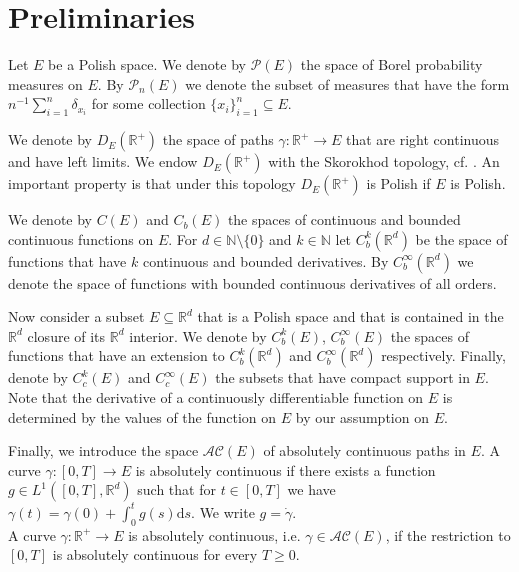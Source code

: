 \documentclass[a4paper]{article}
\newcommand{\cA}{\mathcal{A}}
\newcommand{\cC}{\mathcal{C}}
\newcommand{\cP}{\mathcal{P}}
\newcommand{\bN}{\mathbb{N}}
\newcommand{\bR}{\mathbb{R}}
\newcommand{\dd}{ \mathrm{d}}
\numberwithin{equation}{section}
\theoremstyle{definition}
\begin{document}
\section{Preliminaries} \label{section:preliminaries}

Let $E$ be a Polish space. We denote by $\cP(E)$ the space of Borel probability measures on $E$. By $\cP_n(E)$ we denote the subset of measures that have the form $n^{-1} \sum_{i=1}^n \delta_{x_i}$ for some collection $\{x_i\}_{i=1}^n \subseteq E$.

We denote by $D_E(\bR^+)$ the space of paths $\gamma : \bR^+ \rightarrow E$ that are right continuous and have left limits. We endow $D_E(\bR^+)$ with the Skorokhod topology, cf. \cite[Section 3.5]{EK86}. An important property is that under this topology $D_E(\bR^+)$ is Polish if $E$ is Polish.

We denote by $C(E)$ and $C_b(E)$ the spaces of continuous and bounded continuous functions on $E$. For $d \in \bN \setminus \{0\}$ and $k \in \bN$ let $C_b^k(\bR^d)$ be the space of functions that have $k$ continuous and bounded derivatives. By $C_b^\infty(\bR^d)$ we denote the space of functions with bounded continuous derivatives of all orders. 

Now consider a subset $E \subseteq \bR^d$ that is a Polish space and that is contained in the $\bR^d$ closure of its $\bR^d$ interior. We denote by $C^k_b(E)$, $C^\infty_b(E)$ the spaces of functions that have an extension to $C^k_b(\bR^d)$ and $C^\infty_b(\bR^d)$ respectively. Finally, denote by $C_c^k(E)$ and $C_c^\infty(E)$ the subsets that have compact support in $E$. Note that the derivative of a continuously differentiable function on $E$ is determined by the values of the function on $E$ by our assumption on $E$.

Finally, we introduce the space $\cA\cC(E)$ of absolutely continuous paths in $E$. A curve $\gamma: [0,T] \to E$ is absolutely continuous if there exists a function $g \in L^1([0,T],\bR^d)$ such that for $t \in [0,T]$ we have $\gamma(t) = \gamma(0) + \int_0^t g(s) \dd s$. We write $g = \dot{\gamma}$.\\
A curve $\gamma: \bR^+ \to E$ is absolutely continuous, i.e. $\gamma \in \cA\cC(E)$, if the restriction to $[0,T]$ is absolutely continuous for every $T \geq 0$. 
\end{document}
